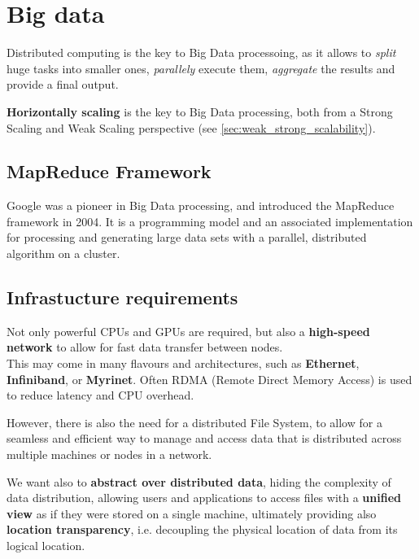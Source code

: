 \chapter{Big data}
\label{chap:big_data}

Distributed computing is the key to Big Data processoing, as it allows to \textit{split} huge tasks into smaller ones, \textit{parallely} execute them, \textit{aggregate} the results and provide a final output.

\textbf{Horizontally scaling} is the key to Big Data processing, both from a Strong Scaling and Weak Scaling perspective (see \autoref{sec:weak_strong_scalability}).

\section{MapReduce Framework}
Google was a pioneer in Big Data processing, and introduced the MapReduce framework in 2004.
It is a programming model and an associated implementation for processing and generating large data sets with a parallel, distributed algorithm on a cluster.



\section{Infrastucture requirements}

Not only powerful CPUs and GPUs are required, but also a \textbf{high-speed network} to allow for fast data transfer between nodes.\\
This may come in many flavours and architectures, such as \textbf{Ethernet}, \textbf{Infiniband}, or \textbf{Myrinet}. Often RDMA (Remote Direct Memory Access) is used to reduce latency and CPU overhead.

However, there is also the need for a distributed File System, to allow for a seamless and efficient way to manage and access data that is distributed across multiple machines or nodes in a network.

We want also to \textbf{abstract over distributed data}, hiding the complexity of data distribution, allowing users and applications to access files with a \textbf{unified view} as if they were stored on a single machine, ultimately providing also \textbf{location transparency}, i.e. decoupling the physical location of data from its logical location.

